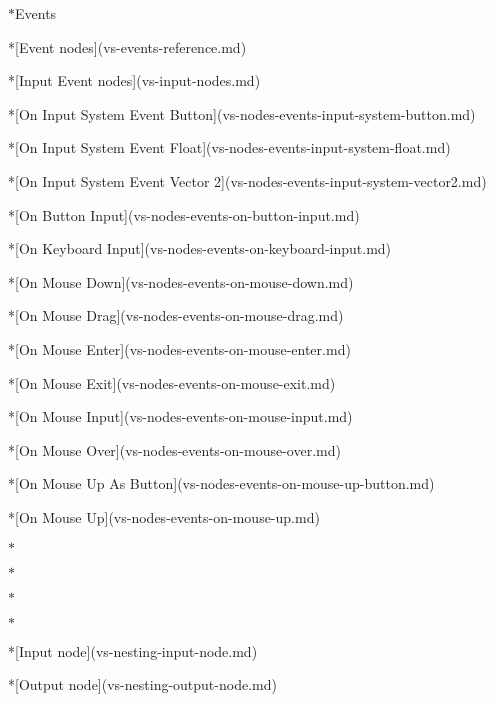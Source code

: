\begin{DoxyItemize}
\texorpdfstring{$\ast$}{*}\+Events \begin{DoxyVerb}*[Event nodes](vs-events-reference.md)

*[Input Event nodes](vs-input-nodes.md)

    *[On Input System Event Button](vs-nodes-events-input-system-button.md)

    *[On Input System Event Float](vs-nodes-events-input-system-float.md)

    *[On Input System Event Vector 2](vs-nodes-events-input-system-vector2.md)

    *[On Button Input](vs-nodes-events-on-button-input.md)

    *[On Keyboard Input](vs-nodes-events-on-keyboard-input.md)

    *[On Mouse Down](vs-nodes-events-on-mouse-down.md)

    *[On Mouse Drag](vs-nodes-events-on-mouse-drag.md)

    *[On Mouse Enter](vs-nodes-events-on-mouse-enter.md)

    *[On Mouse Exit](vs-nodes-events-on-mouse-exit.md)

    *[On Mouse Input](vs-nodes-events-on-mouse-input.md)

    *[On Mouse Over](vs-nodes-events-on-mouse-over.md)

    *[On Mouse Up As Button](vs-nodes-events-on-mouse-up-button.md)

    *[On Mouse Up](vs-nodes-events-on-mouse-up.md)
\end{DoxyVerb}
 \texorpdfstring{$\ast$}{*}

\texorpdfstring{$\ast$}{*}

\texorpdfstring{$\ast$}{*}

\texorpdfstring{$\ast$}{*} \begin{DoxyVerb}*[Input node](vs-nesting-input-node.md)

*[Output node](vs-nesting-output-node.md)


\end{DoxyVerb}
\end{DoxyItemize}
